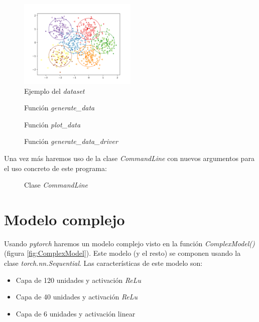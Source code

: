 \documentclass[6pt]{../../shared/AiTex}
\begin{document}
\begin{figure}[H]
    \centering
    \includegraphics[width=0.5\textwidth]{./images/dataset.png}
    \caption{Ejemplo del \textit{dataset}}
    \label{fig:digitos}
\end{figure}

\begin{figure}[H]
    \centering
    
    \caption{Función \textit{generate\_data}}
    \label{fig:generate_data}
\end{figure}

\begin{figure}[H]
    \centering
    
    \caption{Función \textit{plot\_data}}
    \label{fig:plot_data}
\end{figure}

\begin{figure}[H]
    \centering
    
    \caption{Función \textit{generate\_data\_driver}}
    \label{fig:generate_data_driver}
\end{figure}

Una vez más haremos uso de la clase \textit{CommandLine} con nuevos argumentos para el uso concreto de este programa:

\begin{figure}[H]
    \centering
    
    \caption{Clase \textit{CommandLine}}
    \label{fig:CommandLine}
\end{figure}

\section{Modelo complejo}

Usando \textit{pytorch} haremos un modelo complejo visto en la función \textit{ComplexModel()} (figura \ref{fig:ComplexModel}). Este modelo (y el resto) se componen usando la clase \textit{torch.nn.Sequential}. Las características de este modelo son:
\begin{itemize}
    \item Capa de 120 unidades y activación \textit{ReLu}
    \item Capa de 40 unidades y activación \textit{ReLu}
    \item Capa de 6 unidades y activación linear
\end{itemize}
\end{document}
